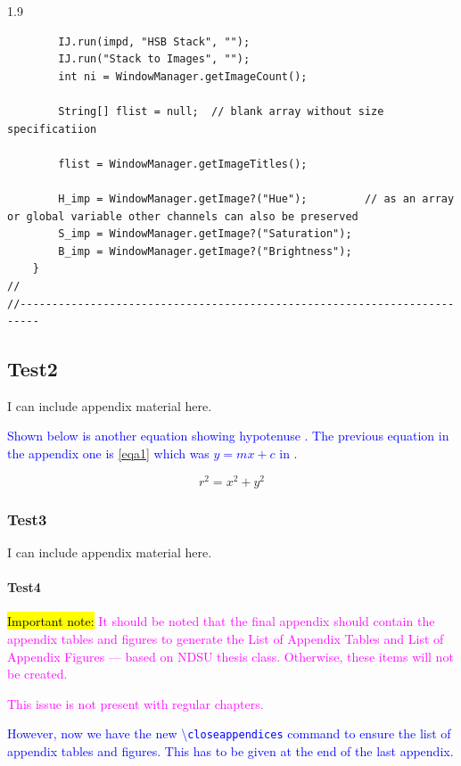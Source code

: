 \documentclass[phd]{ndsu-thesis-2022}
\newcommand\myspacing{1.9}      %
\newcommand\italk[1]{\textcolor{blue}{#1}}  %
\newcommand\cmd[1]{\textbackslash\texttt{#1}}  %
\begin{document}
\begin{spacing}{\myspacing}
{\begin{lstlisting}
		IJ.run(impd, "HSB Stack", "");
		IJ.run("Stack to Images", "");
		int ni = WindowManager.getImageCount();

		String[] flist = null;  // blank array without size specificatiion

		flist = WindowManager.getImageTitles();
		
		H_imp = WindowManager.getImage?("Hue");			// as an array or global variable other channels can also be preserved
		S_imp = WindowManager.getImage?("Saturation");
		B_imp = WindowManager.getImage?("Brightness");
	}	
//
//-------------------------------------------------------------------------	
\end{lstlisting}
}

\subsection{Test2}
I can include appendix material here. 

\italk{Shown below is another equation showing hypotenuse \Cref{eqc1}. The previous equation in the appendix one is \cref{eqa1} which was $y = mx + c$ in \cpageref{eqa1}. } 
 
\vspace{-3ex}
\begin{equation}
r^2 = x^2 + y^2
\label{eqc1}
\end{equation}

\vspace{-2ex}
\subsubsection{Test3}
I can include appendix material here. 

\paragraph{Test4}

{\hl{Important note:}
\textcolor{magenta}{It should be noted that the final appendix should contain the appendix tables and figures to generate the List of Appendix Tables and List of Appendix Figures --- based on NDSU thesis class. Otherwise, these items will not be created.}
} 

\textcolor{magenta}{This issue is not present with regular chapters.}

\italk{However, now we have the new \cmd{closeappendices} command to ensure the list of appendix tables and figures. This has to be given at the end of the last appendix.}


\end{spacing}
\end{document}
